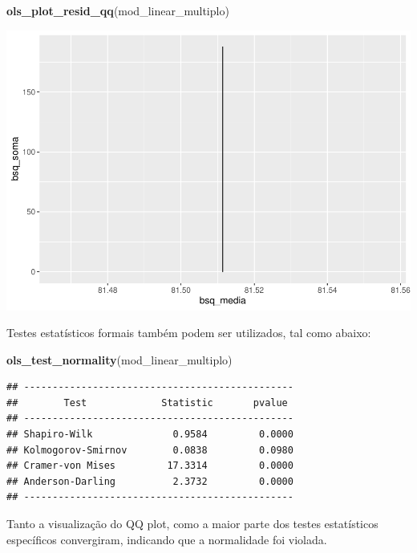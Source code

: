 \documentclass[
]{book}
\newenvironment{Shaded}{\begin{snugshade}}{\end{snugshade}}
\newcommand{\KeywordTok}[1]{\textcolor[rgb]{0.13,0.29,0.53}{\textbf{#1}}}
\newcommand{\NormalTok}[1]{#1}
\begin{document}
\begin{Shaded}
\begin{Highlighting}[]
\KeywordTok{ols_plot_resid_qq}\NormalTok{(mod_linear_multiplo)}
\end{Highlighting}
\end{Shaded}

\begin{center}\includegraphics{gitbook-demo_files/figure-latex/unnamed-chunk-100-1} \end{center}

Testes estatísticos formais também podem ser utilizados, tal como abaixo:

\begin{Shaded}
\begin{Highlighting}[]
\KeywordTok{ols_test_normality}\NormalTok{(mod_linear_multiplo)}
\end{Highlighting}
\end{Shaded}

\begin{verbatim}
## -----------------------------------------------
##        Test             Statistic       pvalue  
## -----------------------------------------------
## Shapiro-Wilk              0.9584         0.0000 
## Kolmogorov-Smirnov        0.0838         0.0980 
## Cramer-von Mises         17.3314         0.0000 
## Anderson-Darling          2.3732         0.0000 
## -----------------------------------------------
\end{verbatim}

Tanto a visualização do QQ plot, como a maior parte dos testes estatísticos específicos convergiram, indicando que a normalidade foi violada.
\end{document}
